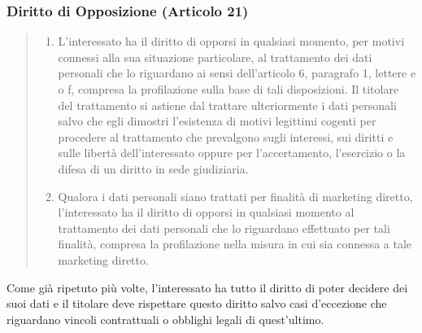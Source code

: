 \subsubsection*{Diritto di Opposizione (Articolo 21)}
\begin{quote}
    \begin{enumerate}
        \item L'interessato ha il diritto di opporsi in qualsiasi momento, per motivi connessi alla sua situazione particolare, al trattamento dei dati personali che lo riguardano ai sensi dell'articolo 6, paragrafo 1, lettere e o f, compresa la profilazione sulla base di tali disposizioni. Il titolare del trattamento si astiene dal trattare ulteriormente i dati personali salvo che egli dimostri l'esistenza di motivi legittimi cogenti per procedere al trattamento che prevalgono sugli interessi, sui diritti e sulle libertà dell'interessato oppure per l'accertamento, l'esercizio o la difesa di un diritto in sede giudiziaria.
        \item Qualora i dati personali siano trattati per finalità di marketing diretto, l'interessato ha il diritto di opporsi in qualsiasi momento al trattamento dei dati personali che lo riguardano effettuato per tali finalità, compresa la profilazione nella misura in cui sia connessa a tale marketing diretto.
    \end{enumerate}
\end{quote}
Come già ripetuto più volte, l'interessato ha tutto il diritto di poter decidere dei suoi dati e il titolare deve rispettare questo diritto salvo casi d'eccezione che riguardano vincoli contrattuali o obblighi legali di quest'ultimo.

